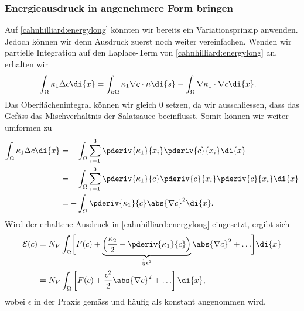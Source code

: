 \subsubsection{Energieausdruck in angenehmere Form bringen}
Auf \eqref{cahnhilliard:energylong} könnten wir bereits ein Variationsprinzip anwenden.
Jedoch können wir denn Ausdruck zuerst noch weiter vereinfachen.
Wenden wir partielle Integration auf den Laplace-Term von \eqref{cahnhilliard:energylong} an,
erhalten wir
\begin{align*}
\int_\Omega \kappa_1 \Delta c \di{x}
&=
\int_{\partial\Omega} \kappa_1 \nabla c \cdot n \di{s}
- \int_\Omega \nabla \kappa_1 \cdot \nabla c \di{x}
.
\end{align*}
Das Oberflächenintegral können wir gleich $0$ setzen,
da wir ausschliessen,
dass das Gefäss das Mischverhältnis der Salatsauce beeinflusst.
Somit können wir weiter umformen zu
\begin{align*}
\int_\Omega \kappa_1 \Delta c \di{x}
&=-\int_\Omega \sum_{i=1}^3 \pderiv{\kappa_1}{x_i} \pderiv{c}{x_i} \di{x}
\\
&=-\int_\Omega \sum_{i=1}^3 \pderiv{\kappa_1}{c} \pderiv{c}{x_i} \pderiv{c}{x_i} \di{x}
\\
&=
-\int_\Omega \pderiv{\kappa_1}{c} \abs{\nabla c}^2 \di{x}
.
\end{align*}
Wird der erhaltene Ausdruck in \eqref{cahnhilliard:energylong} eingesetzt,
ergibt sich
\begin{align}
\mathcal{E}(c)
&=
N_V \int_\Omega \biggl[
  F(c) + \underbrace{\left( \frac{\kappa_2}{2} - \pderiv{\kappa_1}{c} \right)}_{\frac{1}{2}\epsilon^2} \abs{\nabla c}^2  + \ldots
\biggr]\di{x}
\nonumber
\\
&=
N_V \int_\Omega \left[
  F(c) + \frac{\epsilon^2}{2} \abs{\nabla c}^2  + \ldots
\right]\di{x}
,
\label{cahnhilliard:energy}
\end{align}
wobei $\epsilon$ in der Praxis gemäss \cite{cahnhilliard:freeenergy}
und \cite{cahnhilliard:deriv} häufig als konstant angenommen wird.
